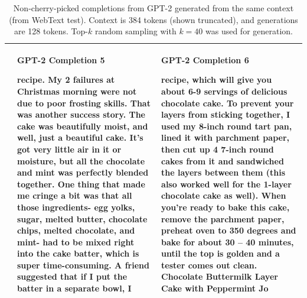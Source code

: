 \documentclass{article}
\begin{document}
\begin{table}[t]
\begin{center}
\begin{tabular}{|p{5cm}|p{5cm}|p{5cm}|}
  &
\centerline{\textbf{GPT-2 Completion 5}}

 recipe.
\newline\newline
My 2 failures at Christmas morning were not due to poor frosting skills. That was another success story. The cake was beautifully moist, and well, just a beautiful cake. It's got very little air in it or moisture, but all the chocolate and mint was perfectly blended together.
\newline\newline
One thing that made me cringe a bit was that all those ingredients- egg yolks, sugar, melted butter, chocolate chips, melted chocolate, and mint- had to be mixed right into the cake batter, which is super time-consuming. A friend suggested that if I put the batter in a separate bowl, I

&

\centerline{\textbf{GPT-2 Completion 6}}
 recipe, which will give you about 6-9 servings of delicious chocolate cake. To prevent your layers from sticking together, I used my 8-inch round tart pan, lined it with parchment paper, then cut up 4 7-inch round cakes from it and sandwiched the layers between them (this also worked well for the 1-layer chocolate cake as well). When you're ready to bake this cake, remove the parchment paper, preheat oven to 350 degrees and bake for about 30 – 40 minutes, until the top is golden and a tester comes out clean.
\newline\newline
Chocolate Buttermilk Layer Cake with Peppermint Jo

 \\
\hline


\end{tabular}
\caption{Non-cherry-picked completions from GPT-2 generated from the same context (from WebText test). Context is 384 tokens (shown truncated), and generations are 128 tokens.  Top-$k$ random sampling with $k = 40$ was used for generation.}
\label{samplesdiverse}
\end{center}
\end{table}
\end{document}
